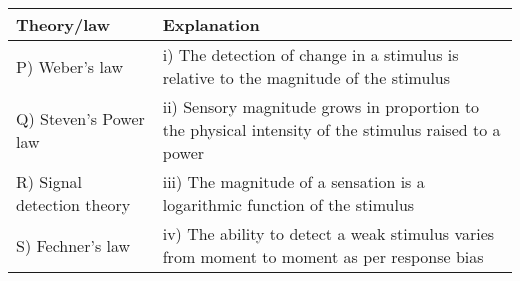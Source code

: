  \begin{tabular}{|l|p{7cm}|}
        \hline
        \textbf{Theory/law} & \textbf{Explanation} \\
        \hline
        P) Weber’s law & i) The detection of change in a stimulus is relative to the magnitude of the stimulus \\
        Q) Steven’s Power law & ii) Sensory magnitude grows in proportion to the physical intensity of the stimulus raised to a power \\
        R) Signal detection theory & iii) The magnitude of a sensation is a logarithmic function of the stimulus \\
        S) Fechner’s law & iv) The ability to detect a weak stimulus varies from moment to moment as per response bias \\
        \hline
    \end{tabular}

